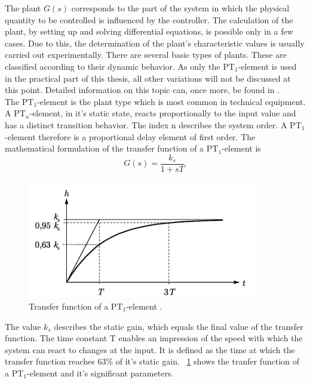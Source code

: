 The plant $G(s)$ corresponds to the part of the system in which the physical quantity to be controlled is influenced by the controller. The calculation of the plant, by setting up and solving differential equations, is possible only in a few cases. Due to this, the determination of the plant's characteristic values is usually carried out experimentally. There are several basic types of plants. These are classified according to their dynamic behavior. As only the PT$_{1}$-element is used in the practical part of this thesis, all other variations will not be discussed at this point. Detailed information on this topic can, once more, be found in \cite{Reg_10}.
\\The PT$_{1}$-element is the plant type which is most common in technical equipment. A PT$_{n}$-element, in it's static state, reacts proportionally to the input value and has a distinct transition behavior. The index n describes the system order. A PT$_{1}$-element therefore is a proportional delay element of first order. The mathematical formulation of the transfer function of a PT$_{1}$-element is
\begin{equation}
    G(s) = \frac{k_{s}}{1+sT}.
 \label{eq:tf_pt1}
\end{equation}

\begin{figure}[h]
   \centering
   \includegraphics[width=0.9\textwidth]{images/tf_pt1.jpg}
   \caption[Tranfer function of a PT$_{1}$-element]{Transfer function of a PT$_{1}$-element \cite{Reg_10}.}
   \label{fig:tf_pt1}
 \end{figure}
The value $k_{s}$ describes the static gain, which equals the final value of the transfer function. The time constant T enables an impression of the speed with which the system can react to changes at the input. It is defined as the time at which the transfer function reaches 63\% of it's static gain. \cite{Reg_10}
\figurename~\ref{fig:tf_pt1} shows the tranfer function of a PT$_{1}$-element and it's significant parameters.


